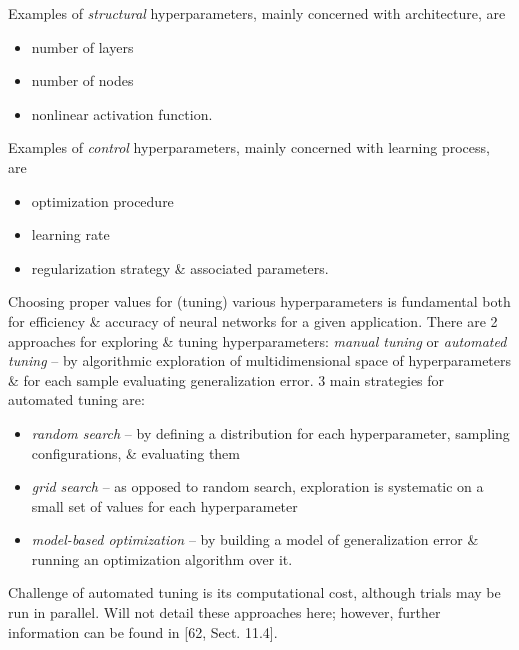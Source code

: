 \documentclass{article}
\begin{document}
\begin{itemize}
\begin{itemize}
\begin{itemize}
			Examples of {\it structural} hyperparameters, mainly concerned with architecture, are
			\begin{itemize}
				\item number of layers
				\item number of nodes
				\item nonlinear activation function.
			\end{itemize}
			Examples of {\it control} hyperparameters, mainly concerned with learning process, are
			\begin{itemize}
				\item optimization procedure
				\item learning rate
				\item regularization strategy \& associated parameters.
			\end{itemize}
			Choosing proper values for (tuning) various hyperparameters is fundamental both for efficiency \& accuracy of neural networks for a given application. There are 2 approaches for exploring \& tuning hyperparameters: {\it manual tuning} or {\it automated tuning} -- by algorithmic exploration of multidimensional space of hyperparameters \& for each sample evaluating generalization error. 3 main strategies for automated tuning are:
			\begin{itemize}
				\item {\it random search} -- by defining a distribution for each hyperparameter, sampling configurations, \& evaluating them
				\item {\it grid search} -- as opposed to random search, exploration is systematic on a small set of values for each hyperparameter
				\item {\it model-based optimization} -- by building a model of generalization error \& running an optimization algorithm over it.
			\end{itemize}
			Challenge of automated tuning is its computational cost, although trials may be run in parallel. Will not detail these approaches here; however, further information can be found in [62, Sect. 11.4].
			

\end{itemize}
\end{itemize}
\end{itemize}
\end{document}

